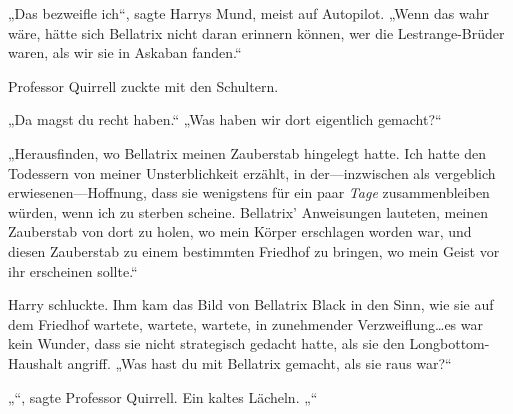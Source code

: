 „Das bezweifle ich“, sagte Harrys Mund, meist auf Autopilot.
„Wenn das wahr wäre, hätte sich Bellatrix nicht daran erinnern können, wer die Lestrange-Brüder waren, als wir sie in Askaban fanden.“

Professor Quirrell zuckte mit den Schultern.

„Da magst du recht haben.“
„Was haben wir dort eigentlich gemacht?“

„Herausfinden, wo Bellatrix meinen Zauberstab hingelegt hatte. Ich hatte den Todessern von meiner Unsterblichkeit erzählt, in der—inzwischen als vergeblich erwiesenen—Hoffnung, dass sie wenigstens für ein paar \emph{Tage} zusammenbleiben würden, wenn ich zu sterben scheine. Bellatrix' Anweisungen lauteten, meinen Zauberstab von dort zu holen, wo mein Körper erschlagen worden war, und diesen Zauberstab zu einem bestimmten Friedhof zu bringen, wo mein Geist vor ihr erscheinen sollte.“

Harry schluckte. Ihm kam das Bild von Bellatrix Black in den Sinn, wie sie auf dem Friedhof wartete, wartete, wartete, in zunehmender Verzweiflung…es war kein Wunder, dass sie nicht strategisch gedacht hatte, als sie den Longbottom-Haushalt angriff.
„Was hast du mit Bellatrix gemacht, als sie raus war?“

„“, sagte Professor Quirrell. Ein kaltes Lächeln. „“

